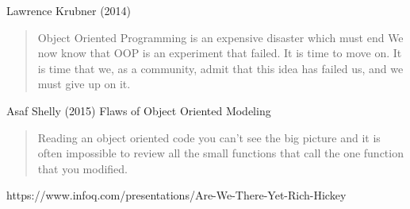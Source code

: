 \documentclass[12pt]{book}
\begin{document}
Lawrence Krubner (2014)
\begin{quote}
	Object Oriented Programming is an expensive disaster which must end
	We now know that OOP is an experiment that failed. It is time to move on. It is time that we, as a community, admit that this idea has failed us, and we must give up on it.
\end{quote}

Asaf Shelly (2015)
Flaws of Object Oriented Modeling
\begin{quote}
	Reading an object oriented code you can't see the big picture and it is often impossible to review all the small functions that call the one function that you modified.
\end{quote}


https://www.infoq.com/presentations/Are-We-There-Yet-Rich-Hickey


\ifx\wholebook\relax\else
% 
% 
	
\end{document}

